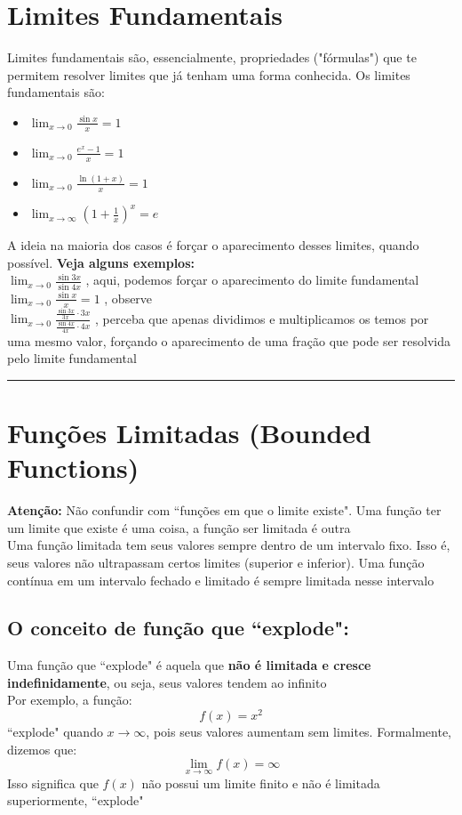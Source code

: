 \documentclass{article}
\begin{document}
\section{Limites Fundamentais}
Limites fundamentais são, essencialmente, propriedades ("fórmulas") que te permitem resolver limites que já tenham uma forma conhecida. Os limites fundamentais são:
\begin{itemize}
\item$\displaystyle \lim_{x \to 0} \frac{\sin x}{x} = 1$
\item$\displaystyle \lim_{x \to 0} \frac{e^x - 1}{x} = 1$
\item$\displaystyle \lim_{x \to 0} \frac{\ln(1 + x)}{x} = 1$
\item$\displaystyle \lim_{x \to \infty} \left(1 + \frac{1}{x}\right)^x = e$
\end{itemize}
A ideia na maioria dos casos é forçar o aparecimento desses limites, quando possível. \textbf{Veja alguns exemplos:}\\[10pt]
$\displaystyle \lim_{x \to 0} \frac{\sin 3x}{\sin 4x}$ , aqui, podemos forçar o aparecimento do limite fundamental $\displaystyle \lim_{x \to 0} \frac{\sin x}{x} = 1$ , observe\\[10pt]
$\displaystyle \lim_{x \to 0} \frac{\frac{\sin 3x}{3x}\cdot3x}{\frac{\sin 4x}{4x}\cdot4x}$ , perceba que apenas dividimos e multiplicamos os temos por uma mesmo valor, forçando o aparecimento de uma fração que pode ser resolvida pelo limite fundamental
\vspace{15pt}
\hrule
\section{Funções Limitadas (Bounded Functions)}
\textbf{Atenção:} Não confundir com ``funções em que o limite existe". Uma função ter um limite que existe é uma coisa, a função ser limitada é outra
\\[10pt]
Uma função limitada tem seus valores sempre dentro de um intervalo fixo. Isso é, seus valores não ultrapassam certos limites (superior e inferior). Uma função contínua em um intervalo fechado e limitado é sempre limitada nesse intervalo

\subsection{O conceito de função que ``explode":} Uma função que ``explode" é aquela que \textbf{não é limitada e cresce indefinidamente}, ou seja, seus valores
tendem ao infinito\\[10pt]
Por exemplo, a função:
\[
f(x) = x^2
\]
``explode" quando \(x \to \infty\), pois seus valores aumentam sem limites. Formalmente, dizemos que:
\[
\lim_{x \to \infty} f(x) = \infty
\]
Isso significa que \(f(x)\) não possui um limite finito e não é limitada superiormente, ``explode"
\end{document}
